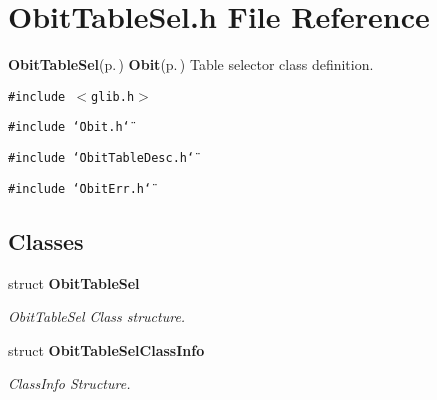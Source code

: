 \section{Obit\-Table\-Sel.h File Reference}
\label{ObitTableSel_8h}
{\bf Obit\-Table\-Sel}{\rm (p.\,\pageref{structObitTableSel})} {\bf Obit}{\rm (p.\,\pageref{structObit})} Table selector class definition. 

{\tt \#include $<$glib.h$>$}\par
{\tt \#include \char`\"{}Obit.h\char`\"{}}\par
{\tt \#include \char`\"{}Obit\-Table\-Desc.h\char`\"{}}\par
{\tt \#include \char`\"{}Obit\-Err.h\char`\"{}}\par
\subsection*{Classes}
\begin{CompactItemize}
\item 
struct {\bf Obit\-Table\-Sel}
\begin{CompactList}\small\item\em Obit\-Table\-Sel Class structure. \item\end{CompactList}\item 
struct {\bf Obit\-Table\-Sel\-Class\-Info}
\begin{CompactList}\small\item\em Class\-Info Structure. \item\end{CompactList}\end{CompactItemize}
